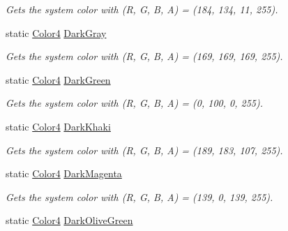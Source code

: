 \begin{DoxyCompactItemize}
\begin{DoxyCompactList}\small\item\em Gets the system color with (R, G, B, A) = (184, 134, 11, 255). \end{DoxyCompactList}\item 
static \hyperlink{struct_open_t_k_1_1_graphics_1_1_color4}{Color4} \hyperlink{struct_open_t_k_1_1_graphics_1_1_color4_a19d89bee4a7cdb5113c5d82a578f82b9}{Dark\-Gray}
\begin{DoxyCompactList}\small\item\em Gets the system color with (R, G, B, A) = (169, 169, 169, 255). \end{DoxyCompactList}\item 
static \hyperlink{struct_open_t_k_1_1_graphics_1_1_color4}{Color4} \hyperlink{struct_open_t_k_1_1_graphics_1_1_color4_aadb9a7f4e36747693597d4c160b8e19a}{Dark\-Green}
\begin{DoxyCompactList}\small\item\em Gets the system color with (R, G, B, A) = (0, 100, 0, 255). \end{DoxyCompactList}\item 
static \hyperlink{struct_open_t_k_1_1_graphics_1_1_color4}{Color4} \hyperlink{struct_open_t_k_1_1_graphics_1_1_color4_ab891fb5db04cbf696746708a96574d85}{Dark\-Khaki}
\begin{DoxyCompactList}\small\item\em Gets the system color with (R, G, B, A) = (189, 183, 107, 255). \end{DoxyCompactList}\item 
static \hyperlink{struct_open_t_k_1_1_graphics_1_1_color4}{Color4} \hyperlink{struct_open_t_k_1_1_graphics_1_1_color4_a0a8a6e5ded40bb62218118e2cea7712a}{Dark\-Magenta}
\begin{DoxyCompactList}\small\item\em Gets the system color with (R, G, B, A) = (139, 0, 139, 255). \end{DoxyCompactList}\item 
static \hyperlink{struct_open_t_k_1_1_graphics_1_1_color4}{Color4} \hyperlink{struct_open_t_k_1_1_graphics_1_1_color4_a27752debe35812e0f48843d273b54764}{Dark\-Olive\-Green}

\end{DoxyCompactItemize}
